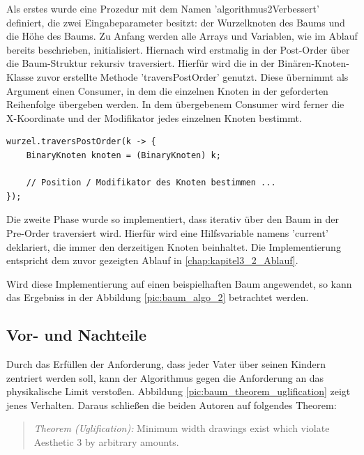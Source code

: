 Als erstes wurde eine Prozedur mit dem Namen 
'algorithmus2Verbessert' definiert, die zwei Eingabeparameter besitzt: der Wurzelknoten des Baums 
und die Höhe des Baums. Zu Anfang werden alle Arrays und Variablen, wie im Ablauf 
bereits beschrieben, initialisiert. Hiernach wird erstmalig in der Post-Order über 
die Baum-Struktur rekursiv traversiert. Hierfür wird die in der Binären-Knoten-Klasse 
zuvor erstellte Methode 'traversPostOrder' genutzt. Diese übernimmt als Argument einen Consumer, 
in dem die einzelnen Knoten in der geforderten Reihenfolge übergeben werden. In dem übergebenem Consumer 
wird ferner die X-Koordinate und der Modifikator jedes einzelnen Knoten bestimmt.

\begin{lstlisting}[caption=Vereinfachte Implementierung der Phase 1, label=code:algo2_phase1]
wurzel.traversPostOrder(k -> {
    BinaryKnoten knoten = (BinaryKnoten) k;

    // Position / Modifikator des Knoten bestimmen ...
});
\end{lstlisting}

Die zweite Phase wurde so implementiert, dass iterativ über den Baum in der Pre-Order traversiert 
wird. Hierfür wird eine Hilfsvariable namens 'current' deklariert, die immer den derzeitigen Knoten beinhaltet. 
Die Implementierung entspricht dem zuvor gezeigten Ablauf in \ref{chap:kapitel3_2_Ablauf}. 

Wird diese Implementierung auf einen beispielhaften Baum angewendet, so kann das Ergebniss
in der Abbildung \ref{pic:baum_algo_2} betrachtet werden.

\subsection{Vor- und Nachteile}
Durch das Erfüllen der Anforderung, dass jeder Vater über seinen Kindern zentriert werden soll, kann der Algorithmus gegen
die Anforderung an das physikalische Limit verstoßen. 
Abbildung \ref{pic:baum_theorem_uglification} zeigt jenes Verhalten. Daraus schließen die beiden Autoren auf folgendes Theorem:

\begin{quotation}
	\textit{Theorem (Uglification):} Minimum width drawings exist which violate Aesthetic 3 by arbitrary amounts.\cite[]{q1}
\end{quotation}

